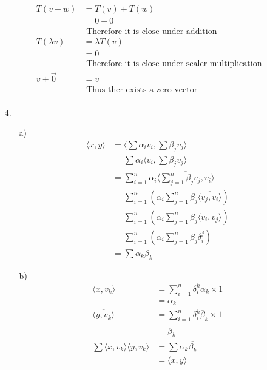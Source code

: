 \documentclass{article}
\begin{document}
\begin{itemize}
    \begin{align*}
        T(v+w)&=T(v)+T(w)\\
        &=0+0\\
        &\text{ Therefore it is close under addition }\\
        T(\lambda v) &= \lambda T(v)\\
        &=0\\
        &\text{ Therefore it is close under scaler multiplication }\\
        v+\overrightarrow{0}&=v\\
        &\text{ Thus ther exists a zero vector }\\
    \end{align*}
    \item [4.]
    \begin{itemize}
        \item [a)]
        \begin{align*}
            \langle x,y\rangle  &=\langle \sum\alpha_iv_i,\sum\beta_jv_j\rangle \\
            &=\sum \alpha_i \langle  v_i,\sum \beta_j v_j\rangle \\
            &=\sum_{i=1}^{n} \alpha_i \overline{\langle \sum_{j=1}^n\beta_jv_j,v_i\rangle }\\
            &=\sum_{i=1}^n \left(\alpha_i \sum_{j=1}^n \overline{\beta_j}\overline{\langle v_j,v_i\rangle }\right)\\
            &=\sum_{i=1}^n \left(\alpha_i \sum_{j=1}^n \overline{\beta_j}\langle v_i,v_j\rangle \right)\\
            &=\sum_{i=1}^{n} \left(\alpha_i\sum_{j=1}^{n} \overline{\beta_j}\delta_i^j\right)\\
            &=\sum \alpha_k\beta_k
        \end{align*}
        \item [b)]
        \begin{align*}
            \langle x,v_k\rangle &=\sum_{i=1}^{n} \delta_{i}^k\alpha_k \times 1\\
            &=\alpha_k\\
            \overline{\langle y,v_k\rangle }&=\sum_{i=1}^{n} \delta_{i}^k\overline{\beta}_k \times 1\\
            &=\overline{\beta}_k\\
            \sum\langle x,v_k\rangle \overline{\langle y,v_k\rangle }&=\sum \alpha_k\overline{\beta_k}\\
            &=\langle x,y\rangle 
        \end{align*}

\end{itemize}
\end{itemize}
\end{document}
